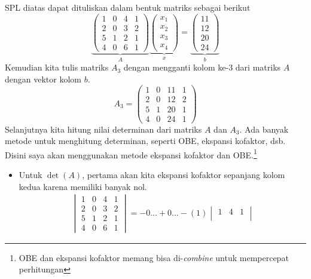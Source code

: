 \documentclass[10pt,openany,a4paper]{article}
\begin{document}
\begin{enumerate}
        SPL diatas dapat dituliskan dalam bentuk matriks sebagai berikut
        \[\underbrace{\begin{pmatrix}
            1 & 0 & 4 & 1\\
            2 & 0 & 3 & 2\\
            5 & 1 & 2 & 1\\
            4 & 0 & 6 & 1
        \end{pmatrix}}_{A}\underbrace{\begin{pmatrix}
            x_1\\x_2\\x_3\\x_4
        \end{pmatrix}}_{x}=\underbrace{\begin{pmatrix}
            11\\12\\20\\24
        \end{pmatrix}}_{b}\]
        Kemudian kita tulis matriks $A_3$ dengan mengganti kolom ke-3 dari matriks $A$ dengan vektor kolom $b$.
        \[A_3=\begin{pmatrix}
            1 & 0 & 11 & 1\\
            2 & 0 & 12 & 2\\
            5 & 1 & 20 & 1\\
            4 & 0 & 24 & 1
        \end{pmatrix}\]
        Selanjutnya kita hitung nilai determinan dari matriks $A$ dan $A_3$. Ada banyak metode untuk menghitung determinan, seperti OBE, ekspansi kofaktor, dsb. Disini saya akan menggunakan metode ekspansi kofaktor dan OBE.\footnote{OBE dan ekspansi kofaktor memang bisa di-\textit{combine} untuk mempercepat perhitungan}
        \begin{itemize}
            \item Untuk $\det(A)$, pertama akan kita ekspansi kofaktor sepanjang kolom kedua karena memiliki banyak nol.
            \begin{align*}
                \begin{vmatrix}
                    1 & 0 & 4 & 1\\
                    2 & 0 & 3 & 2\\
                    5 & 1 & 2 & 1\\
                    4 & 0 & 6 & 1
                \end{vmatrix}=-0...+0...-(1)\begin{vmatrix}
                    1 & 4 & 1\\

\end{vmatrix}
\end{align*}
\end{itemize}
\end{enumerate}
\end{document}
